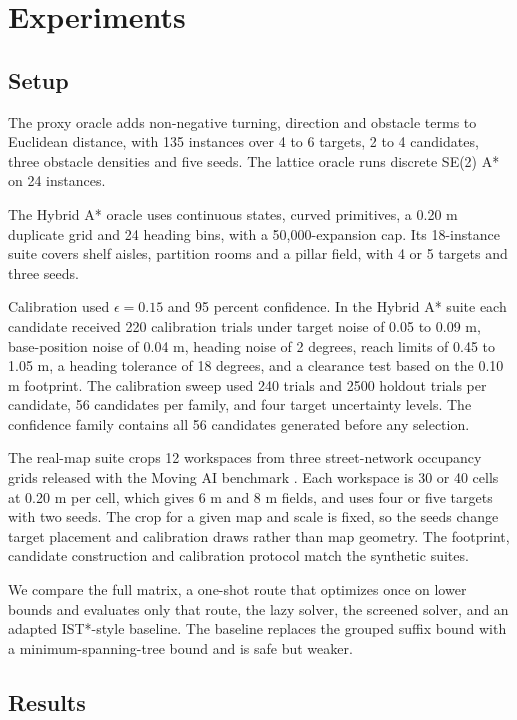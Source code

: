 \documentclass[conference]{IEEEtran}
\begin{document}
\section{Experiments}

\subsection{Setup}

The proxy oracle adds non-negative turning, direction and obstacle terms to Euclidean distance, with 135 instances over 4 to 6 targets, 2 to 4 candidates, three obstacle densities and five seeds. The lattice oracle runs discrete SE(2) A* on 24 instances.

The Hybrid A* oracle uses continuous states, curved primitives, a 0.20 m duplicate grid and 24 heading bins, with a 50,000-expansion cap. Its 18-instance suite covers shelf aisles, partition rooms and a pillar field, with 4 or 5 targets and three seeds.

Calibration used $\epsilon=0.15$ and 95 percent confidence. In the Hybrid A* suite each candidate received 220 calibration trials under target noise of 0.05 to 0.09 m, base-position noise of 0.04 m, heading noise of 2 degrees, reach limits of 0.45 to 1.05 m, a heading tolerance of 18 degrees, and a clearance test based on the 0.10 m footprint. The calibration sweep used 240 trials and 2500 holdout trials per candidate, 56 candidates per family, and four target uncertainty levels. The confidence family contains all 56 candidates generated before any selection.

The real-map suite crops 12 workspaces from three street-network occupancy grids released with the Moving AI benchmark \cite{sturtevant2012}. Each workspace is 30 or 40 cells at 0.20 m per cell, which gives 6 m and 8 m fields, and uses four or five targets with two seeds. The crop for a given map and scale is fixed, so the seeds change target placement and calibration draws rather than map geometry. The footprint, candidate construction and calibration protocol match the synthetic suites.

We compare the full matrix, a one-shot route that optimizes once on lower bounds and evaluates only that route, the lazy solver, the screened solver, and an adapted IST*-style baseline. The baseline replaces the grouped suffix bound with a minimum-spanning-tree bound and is safe but weaker.

\subsection{Results}
\end{document}
